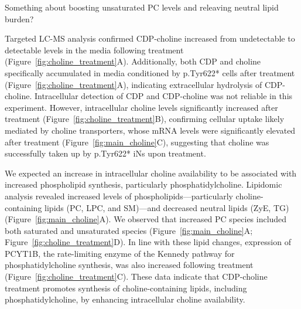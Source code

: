 Something about boosting unsaturated PC levels and releaving neutral lipid burden?

Targeted LC-MS analysis confirmed CDP-choline increased from undetectable to detectable levels in the media following treatment (Figure~\ref{fig:choline_treatment}A). Additionally, both CDP and choline specifically accumulated in media conditioned by p.Tyr622* cells after treatment (Figure~\ref{fig:choline_treatment}A), indicating extracellular hydrolysis of CDP-choline. Intracellular detection of CDP and CDP-choline was not reliable in this experiment. However, intracellular choline levels significantly increased after treatment (Figure~\ref{fig:choline_treatment}B), confirming cellular uptake likely mediated by choline transporters, whose mRNA levels were significantly elevated after treatment (Figure~\ref{fig:main_choline}C), suggesting that choline was successfully taken up by p.Tyr622* iNs upon treatment. 

We expected an increase in intracellular choline availability to be associated with increased phospholipid synthesis, particularly phosphatidylcholine. Lipidomic analysis revealed increased levels of phospholipids—particularly choline-containing lipids (PC, LPC, and SM)—and decreased neutral lipids (ZyE, TG) (Figure~\ref{fig:main_choline}A). We observed that increased PC species included both saturated and unsaturated species (Figure~\ref{fig:main_choline}A; Figure~\ref{fig:choline_treatment}D). In line with these lipid changes, expression of PCYT1B, the rate-limiting enzyme of the Kennedy pathway for phosphatidylcholine synthesis, was also increased following treatment (Figure~\ref{fig:choline_treatment}C). These data indicate that CDP-choline treatment promotes synthesis of choline-containing lipids, including phosphatidylcholine, by enhancing intracellular choline availability. 


